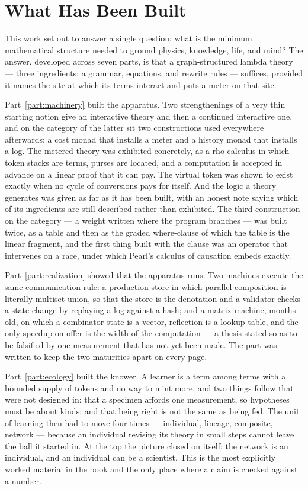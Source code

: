 \chapter*{What Has Been Built}

This work set out to answer a single question: what is the minimum
mathematical structure needed to ground physics, knowledge, life, and
mind?
The answer, developed across seven parts, is that a graph-structured lambda
theory --- three ingredients: a grammar, equations, and rewrite rules ---
suffices, provided it names the site at which its terms interact and puts
a meter on that site.

Part~\ref{part:machinery} built the apparatus.
Two strengthenings of a very thin starting notion give an interactive
theory and then a continued interactive one, and on the category of the
latter sit two constructions used everywhere afterwards: a cost monad
that installs a meter and a history monad that installs a log.
The metered theory was exhibited concretely, as a rho calculus in which
token stacks are terms, purses are located, and a computation is accepted
in advance on a linear proof that it can pay.
The virtual token was shown to exist exactly when no cycle of conversions
pays for itself.
And the logic a theory generates was given as far as it has been built,
with an honest note saying which of its ingredients are still described
rather than exhibited.
The third construction on the category --- a weight written where the
program branches --- was built twice, as a table and then as the graded
where-clause of which the table is the linear fragment, and the first
thing built with the clause was an operator that intervenes on a race,
under which Pearl's calculus of causation embeds exactly.

Part~\ref{part:realization} showed that the apparatus runs.
Two machines execute the same communication rule: a production store in
which parallel composition is literally multiset union, so that the store
is the denotation and a validator checks a state change by replaying a
log against a hash; and a matrix machine, months old, on which a
combinator state is a vector, reflection is a lookup table, and the only
speedup on offer is the width of the computation --- a thesis stated so as
to be falsified by one measurement that has not yet been made.
The part was written to keep the two maturities apart on every page.

Part~\ref{part:ecology} built the knower.
A learner is a term among terms with a bounded supply of tokens and no
way to mint more, and two things follow that were not designed in: that a
specimen affords one measurement, so hypotheses must be about kinds; and
that being right is not the same as being fed.
The unit of learning then had to move four times --- individual, lineage,
composite, network --- because an individual revising its theory in small
steps cannot leave the ball it started in.
At the top the picture closed on itself: the network is an individual,
and an individual can be a scientist.
This is the most explicitly worked material in the book and the only
place where a claim is checked against a number.

